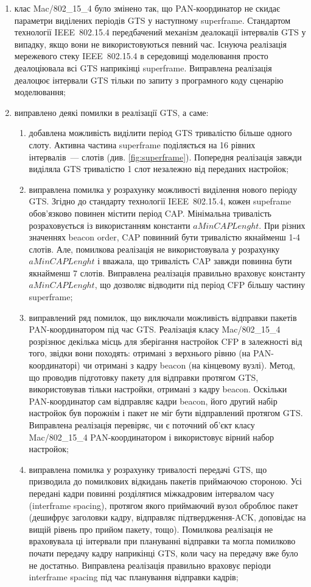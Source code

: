 \documentclass[a4paper,ukrainian,utf8,nocolumnsxix,floatsection,equationsection]{eskdtext}
\newcommand{\iee}[0]{IEEE~802.15.4\xspace}
\begin{document}
\begin{enumerate}
	\item клас Mac/802\_15\_4 було змінено так, що PAN-координатор не скидає параметри виділених періодів GTS у наступному superframe. Стандартом технології \iee передбачений механізм деалокації інтервалів GTS у випадку, якщо вони не використовуються певний час. Існуюча реалізація мережевого стеку \iee в середовищі моделювання просто деалоціювала всі GTS наприкінці superframe. Виправлена реалізація деалоцює інтервали GTS тільки по запиту з програмного коду сценарію моделювання;

	\item виправлено деякі помилки в реалізації GTS, а саме:
	\begin{enumerate}
		\item добавлена можливість виділити період GTS тривалістю більше одного слоту. Активна частина superframe поділяється на 16 рівних інтервалів~--- слотів (див. \cref{fig:superframe}). Попередня реалізація завжди виділяла GTS тривалістю 1 слот незалежно від переданих настройок;

		\item виправлена помилка у розрахунку можливості виділення нового періоду GTS. Згідно до стандарту технології \iee, кожен supeframe обов'язково повинен містити період CAP. Мінімальна тривалість розраховується із використанням константи $aMinCAPLenght$. При різних значеннях beacon order, CAP повинний бути тривалістю якнайменш 1-4 слотів. Але, помилкова реалізація не використовувала у розрахунку $aMinCAPLenght$ і вважала, що тривалість CAP завжди повинна бути якнайменш 7 слотів. Виправлена реалізація правильно враховує константу $aMinCAPLenght$, що дозволяє відводити під період CFP більшу частину superframe;

		\item виправлений ряд помилок, що виключали можливість відправки пакетів PAN-координатором під час GTS. Реалізація класу Mac/802\_15\_4 розрізнює декілька місць для зберігання настройок CFP в залежності від того, звідки вони походять: отримані з верхнього рівню (на PAN-координаторі) чи отримані з кадру beacon (на кінцевому вузлі). Метод, що проводив підготовку пакету для відправки протягом GTS, використовував тільки настройки, отримані з кадру beacon. Оскільки PAN-координатор сам відправляє кадри beacon, його другий набір настройок був порожнім і пакет не міг бути відправлений протягом GTS. Виправлена реалізація перевіряє, чи є поточний об'єкт класу Mac/802\_15\_4 PAN-координатором і використовує вірний набор настройок;

		\item виправлена помилка у розрахунку тривалості передачі GTS, що призводила до помилкових відкидань пакетів приймаючою стороною. Усі передані кадри повинні розділятися міжкадровим інтервалом часу (interframe spacing), протягом якого приймаючий вузол оброблює пакет (дешифрує заголовки кадру, відправляє підтвердження-ACK, доповідає на вищій рівень про прийом пакету, тощо). Помилкова реалізація не враховувала ці інтервали при плануванні відправки та могла помилково почати передачу кадру наприкінці GTS, коли часу на передачу вже було не достатньо. Виправлена реалізація правильно враховує періоди interframe spacing під час планування відправки кадрів;


\end{enumerate}
\end{enumerate}
\end{document}
